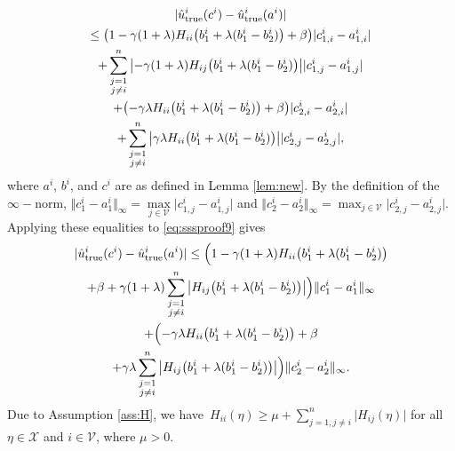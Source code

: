 \documentclass[9pt,shortpaper,twoside,web]{ieeecolor}
\newcommand{\X}{\ensuremath{\mathcal{X}}\xspace}
\newcommand{\V}{\ensuremath{\mathcal{V}}\xspace}
\newcommand{\tr}{\textnormal{true}}
\begin{document}
    \begin{multline}\label{eq:sssproof9}
        \vert \hat u^i_\tr(c^i)-\hat u^i_\tr(a^i)\vert 
        \\ \leq \big(1-\gamma(1+\lambda) H_{ii}\big(b^i_1 +\lambda (b^i_1-b^i_2)\big) + \beta\big)\vert c^i_{1,i}-a^i_{1,i}\vert
        \\+ \sum_{\substack{j=1\\j\not=i}}^n\big\vert {-\gamma}(1+\lambda)H_{ij}\big(b^i_1+\lambda(b^i_1-b^i_2)\big)\big\vert \vert c^i_{1,j}-a^i_{1,j}\vert
        \\ +\big({-\gamma}\lambda H_{ii}\big(b^i_1+\lambda(b^i_1-b^i_2)\big)+\beta\big)\vert c^i_{2,i}-a^i_{2,i}\vert
        \\ + \sum_{\substack{j=1\\j\not=i}}^n \big\vert \gamma\lambda H_{ii}\big(b^i_1+\lambda(b^i_1-b^i_2)\big)\big\vert \vert c^i_{2,j}-a^i_{2,j}\vert,
    \end{multline}
    where $a^i$, $b^i$, and $c^i$ are as defined in Lemma \ref{lem:new}.
    By the definition of the $\infty-$norm, $\Vert c^i_1-a^i_1\Vert_\infty =\max\limits_{j\in\V}\vert c^i_{1,j}-a^i_{1,j}\vert$ and $\Vert c^i_2-a^i_2\Vert_\infty = \max_{j\in\V}\vert c^i_{2,j}-a^i_{2,j}\vert$.
    Applying these equalities to \eqref{eq:sssproof9} gives
    \begin{multline}\label{eq:sssproof10}
        \vert \hat u^i_\tr(c^i) - \hat{u}^i_\tr(a^i)\vert
        \leq \Big(1- \gamma(1+\lambda) H_{ii}\big(b^i_1+\lambda(b^i_1-b^i_2)\big)
        \\+\beta + \gamma(1+\lambda) \sum_{\substack{j=1\\j\not=i}}^n\big\vert H_{ij}\big(b^i_1 + \lambda(b^i_1-b^i_2)\big)\big\vert\Big)\Vert c^i_1-a^i_1\Vert_\infty
        \\ + \Big({-\gamma}\lambda H_{ii}\big(b^i_1+\lambda(b^i_1-b^i_2)\big)+\beta \\+ \gamma\lambda\sum_{\substack{j=1\\j\not=i}}^{n}\big\vert H_{ij}\big(b^i_1
        +\lambda(b^i_1-b^i_2)\big)\big\vert\Big)\Vert c^i_2-a^i_2\Vert_\infty.
    \end{multline}
    Due to Assumption \ref{ass:H}, we have~$H_{ii}(\eta)\geq \mu + \sum_{j=1,j\not=i}^n\vert H_{ij}(\eta)\vert$ for all $\eta\in\X$ and $i\in\V$, where $\mu > 0$.
\end{document}

